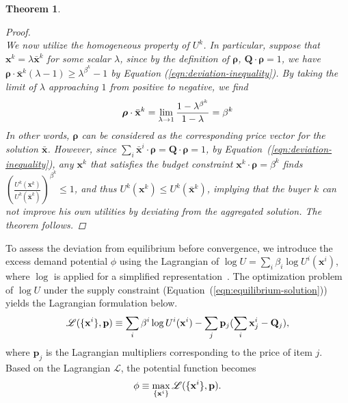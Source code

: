 \documentclass[conference]{IEEEtran}
\theoremstyle{plain}
\newtheorem{theorem}{Theorem}
\newcommand*{\defeq}{\equiv}
\begin{document}
\begin{theorem}
{\begin{proof}
\begin{equation}
        \end{equation}
        We now utilize the homogeneous property of $U^k$. In particular, suppose that $\mathbf{x}^k = \lambda \bar{\mathbf{x}}^k$ for some scalar $\lambda$, since by the definition of $\boldsymbol{\rho}$, $\mathbf{Q}\cdot\boldsymbol{\rho} = 1$, we have $\boldsymbol{\rho} \cdot \bar{\mathbf{x}}^k (\lambda - 1) \geq \lambda^{\beta^k} - 1$ by Equation (\ref{eqn:deviation-inequality}). By taking the limit of $\lambda$ approaching $1$ from positive to negative, we find 
        \begin{equation}\small
            \boldsymbol{\rho}\cdot \bar{\mathbf{x}}^k = \lim_{\lambda \rightarrow 1} \frac{1-\lambda^{\beta^k}}{1-\lambda} = \beta^k
        \end{equation}
        In other words, $\boldsymbol{\rho}$ can be considered as the corresponding price vector for the solution $\bar{\mathbf{x}}$. However, since $\sum_i \bar{\mathbf{x}}^i \cdot \boldsymbol{\rho} = \mathbf{Q}\cdot \boldsymbol{\rho} = 1$, by Equation~(\ref{eqn:deviation-inequality}), any $\mathbf{x}^k$ that satisfies the budget constraint $\mathbf{x}^k\cdot \boldsymbol{\rho} = \beta^k$ finds $\left(\frac{U^k(\mathbf{x}^k)}{U^k(\bar{\mathbf{x}}^k)}\right)^{\beta^k} \leq 1$, and thus $U^k(\mathbf{x}^k) \leq U^k(\bar{\mathbf{x}}^k)$, implying that the buyer $k$ can not improve his own utilities by deviating from the aggregated solution. The theorem follows.
    \end{proof}
    }
\end{theorem}

To assess the deviation from equilibrium before convergence, we introduce the excess demand potential $\phi$ using the Lagrangian of $\log U = \sum_{i} \beta_i \log U^i(\mathbf{x}^i)$, where $\log$ is applied for a simplified representation~\cite{devanur2008market}. The optimization problem of $\log U$ under the supply constraint (Equation~(\ref{eqn:equilibrium-solution})) yields the Lagrangian formulation below.
\begin{equation}\small
    \label{eqn:lagrangian}
    \mathscr{L}(\{\mathbf{x}^i\}, \mathbf{p}) \defeq \sum_i \beta^i\log U^i(\mathbf{x}^i) - \sum_j \mathbf{p}_j (\sum_i\mathbf{x}^i_j - \mathbf{Q}_j),
\end{equation}
where $\mathbf{p}_j$ is the Lagrangian multipliers corresponding to the price of item $j$. Based on the Lagrangian $\mathscr{L}$, the potential function becomes
\begin{equation}\small
    \label{eqn:potential-function}
    \phi \defeq \max_{\{\mathbf{x}^i\}} \mathscr{L}(\{\mathbf{x}^i\}, \mathbf{p}).
\end{equation}
\end{document}
